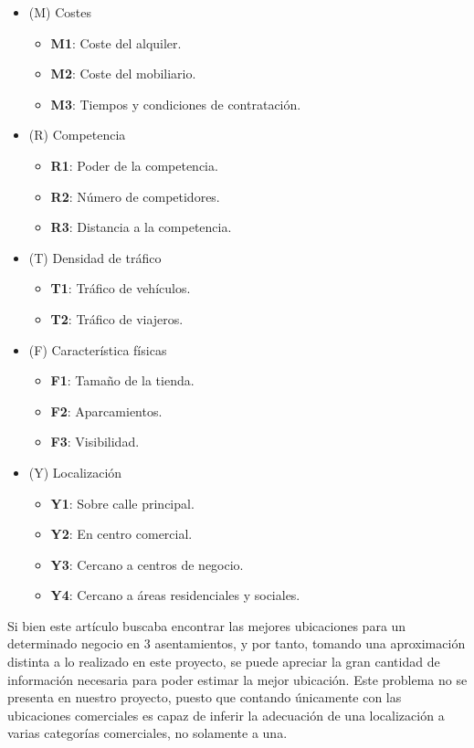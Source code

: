 \begin{itemize}
		\item 			(M) Costes  \begin{itemize}
		\item \textbf{M1}: Coste del alquiler.
		\item \textbf{M2}: Coste del mobiliario.
		\item \textbf{M3}: Tiempos y condiciones de contratación.
	\end{itemize}
	\item  			(R) Competencia  \begin{itemize}
		\item \textbf{R1}: Poder de la competencia.
		\item \textbf{R2}: Número de competidores.
		\item \textbf{R3}: Distancia a la competencia.	
	\end{itemize} 
		\item 					(T) Densidad de tráfico  \begin{itemize}
			\item \textbf{T1}: Tráfico de vehículos.
			\item \textbf{T2}: Tráfico de viajeros.
		\end{itemize}
	\item 			(F) Característica físicas  \begin{itemize}
		\item \textbf{F1}: Tamaño de la tienda.
		\item \textbf{F2}: Aparcamientos.
		\item \textbf{F3}: Visibilidad.
	\end{itemize}
	\item 			(Y) Localización  \begin{itemize}
		\item \textbf{Y1}: Sobre calle principal.
		\item \textbf{Y2}: En centro comercial.
		\item \textbf{Y3}: Cercano a centros de negocio.
		\item \textbf{Y4}: Cercano a áreas residenciales y sociales.
	\end{itemize}
\end{itemize}

Si bien este artículo buscaba encontrar las mejores ubicaciones para un determinado negocio en 3 asentamientos, y por tanto, tomando una aproximación distinta a lo realizado en este proyecto, se puede apreciar la gran cantidad de información necesaria para poder estimar la mejor ubicación. Este problema no se presenta en nuestro proyecto, puesto que contando únicamente con las ubicaciones comerciales es capaz de inferir la adecuación de una localización a varias categorías comerciales, no solamente a una.



